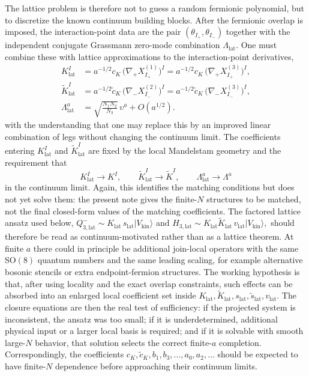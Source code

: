 \documentclass[11pt]{article}
\numberwithin{equation}{section}
\begin{document}
The lattice problem is therefore not to guess a random fermionic polynomial, but to discretize the known continuum building blocks. After the fermionic overlap is imposed, the interaction-point data are the pair $(\theta_{I_+},\theta_{I_-})$ together with the independent conjugate Grassmann zero-mode combination $\Lambda_{\mathrm{lat}}$. One must combine these with lattice approximations to the interaction-point derivatives,
\begin{equation}
\label{eq:s14-028}
\begin{aligned}
K^I_{\mathrm{lat}}
&=
a^{-1/2}c_K\,\bigl(\nabla_+ X_{I_+}^{(1)}\bigr)^I
=
a^{-1/2}c_K\,\bigl(\nabla_+ X_{I_+}^{(3)}\bigr)^I,\\
\widetilde K^I_{\mathrm{lat}}
&=
a^{-1/2}\widetilde c_K\,\bigl(\nabla_- X_{I_-}^{(2)}\bigr)^I
=
a^{-1/2}\widetilde c_K\,\bigl(\nabla_- X_{I_-}^{(3)}\bigr)^I,\\
\Lambda_{\mathrm{lat}}^a
&=
\sqrt{\frac{N_1N_2}{N_3}}\,\upsilon^a + O(a^{1/2}).
\end{aligned}
\end{equation}
with the understanding that one may replace this by an improved linear combination of legs without changing the continuum limit. The coefficients entering $K^I_{\mathrm{lat}}$ and $\widetilde K^I_{\mathrm{lat}}$ are fixed by the local Mandelstam geometry and the requirement that
\begin{equation}
\label{eq:s14-029}
K^I_{\mathrm{lat}}\to K^I,
\qquad
\widetilde K^I_{\mathrm{lat}}\to \widetilde K^I,
\qquad
\Lambda^a_{\mathrm{lat}}\to \Lambda^a
\end{equation}
in the continuum limit. Again, this identifies the matching conditions but does not yet solve them: the present note gives the finite-$N$ structures to be matched, not the final closed-form values of the matching coefficients.
The factored lattice ansatz used below,
\(
Q^-_{3,\mathrm{lat}}\sim K_{\mathrm{lat}}\,s_{\mathrm{lat}}|V_{\mathrm{kin}}\rangle
\)
and
\(
H_{3,\mathrm{lat}}\sim K_{\mathrm{lat}}\widetilde K_{\mathrm{lat}}\,v_{\mathrm{lat}}|V_{\mathrm{kin}}\rangle,
\)
should therefore be read as continuum-motivated rather than as a lattice theorem. At finite $a$ there could in principle be additional join-local operators with the same SO$(8)$ quantum numbers and the same leading scaling, for example alternative bosonic stencils or extra endpoint-fermion structures. The working hypothesis is that, after using locality and the exact overlap constraints, such effects can be absorbed into an enlarged local coefficient set inside $K_{\mathrm{lat}},\widetilde K_{\mathrm{lat}},s_{\mathrm{lat}},\widetilde s_{\mathrm{lat}},v_{\mathrm{lat}}$. The closure equations are then the real test of sufficiency: if the projected system is inconsistent, the ansatz was too small; if it is underdetermined, additional physical input or a larger local basis is required; and if it is solvable with smooth large-$N$ behavior, that solution selects the correct finite-$a$ completion. Correspondingly, the coefficients $c_K,\widetilde c_K,b_1,b_3,\dots,a_0,a_2,\dots$ should be expected to have finite-$N$ dependence before approaching their continuum limits.
\end{document}

